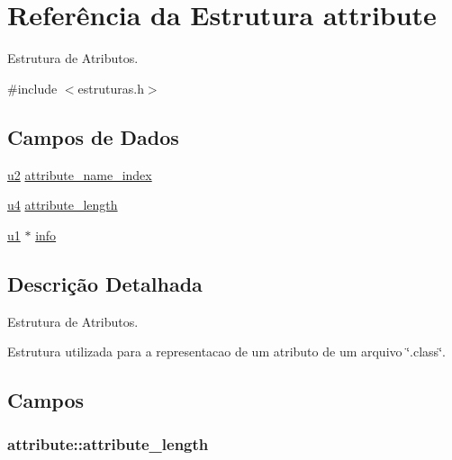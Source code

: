 \hypertarget{structattribute}{}\section{Referência da Estrutura attribute}
\label{structattribute}


Estrutura de Atributos.  




{\ttfamily \#include $<$estruturas.\+h$>$}

\subsection*{Campos de Dados}
\begin{DoxyCompactItemize}
\item 
\hyperlink{estruturas_8h_a5f223212eef04d10a4550ded680cb1cf}{u2} \hyperlink{structattribute_a55761ad4a2ed18b8f88baf6ac062cb46}{attribute\+\_\+name\+\_\+index}
\item 
\hyperlink{estruturas_8h_aedf6ddc03df8caaaccbb4c60b9a9b850}{u4} \hyperlink{structattribute_a3d9b605228c53c92be5e5b49ff24a35c}{attribute\+\_\+length}
\item 
\hyperlink{estruturas_8h_a216a9f8b04b4f0af84a4ca9d1d85a6ca}{u1} $\ast$ \hyperlink{structattribute_ac749b125ccc9eda0cfe9deb4fe4aeda9}{info}
\end{DoxyCompactItemize}


\subsection{Descrição Detalhada}
Estrutura de Atributos. 

Estrutura utilizada para a representacao de um atributo de um arquivo \char`\"{}.\+class\char`\"{}. 

\subsection{Campos}
\subsubsection[{\texorpdfstring{attribute\+\_\+length}{attribute_length}}]{ attribute\+::attribute\+\_\+length}\hypertarget{structattribute_a3d9b605228c53c92be5e5b49ff24a35c}{}\label{structattribute_a3d9b605228c53c92be5e5b49ff24a35c}
